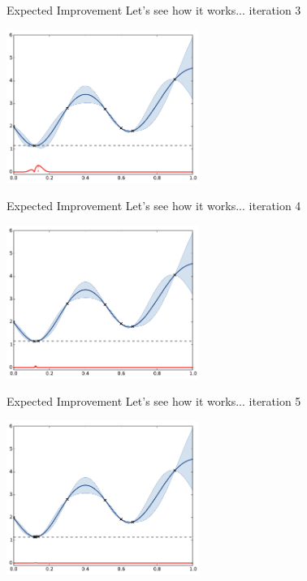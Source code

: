 \begin{frame}[noframenumbering]{Expected Improvement}
Let's see how it works... iteration 3
\begin{center}
\includegraphics[height=5cm]{4_optimization/figures/python/ego_EI3}
\end{center}
\end{frame}

\begin{frame}[noframenumbering]{Expected Improvement}
Let's see how it works... iteration 4
\begin{center}
\includegraphics[height=5cm]{4_optimization/figures/python/ego_EI4}
\end{center}
\end{frame}

\begin{frame}[noframenumbering]{Expected Improvement}
Let's see how it works... iteration 5
\begin{center}
\includegraphics[height=5cm]{4_optimization/figures/python/ego_EI9}
\end{center}
\end{frame}

